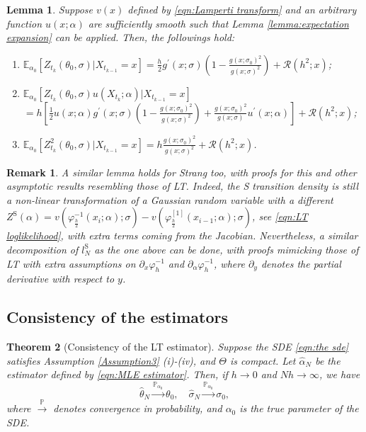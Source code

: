 \documentclass[a4paper,12pt]{article}
\numberwithin{equation}{section}
\theoremstyle{plain}
\newtheorem{theorem}{Theorem}[section]
\newtheorem{lemma}[theorem]{Lemma}
\newtheorem{remark}{Remark}
\theoremstyle{definition}
\begin{document}
\begin{lemma}\label{lemma:Z moment bounds}
    Suppose $v(x)$ defined by \eqref{eqn:Lamperti transform} and an arbitrary function $u(x;\alpha)$ are sufficiently smooth such that Lemma \ref{lemma:expectation expansion} can be applied. Then, the followings hold:
    \begin{enumerate}
        \item[(i)]
            $\mathbb{E}_{\alpha_0}[Z_{t_k}(\theta_0,\sigma)|X_{t_{k-1}}=x]=\frac{h}{2}g^\prime(x;\sigma)(1-\frac{g(x;\sigma_0)^2}{g(x;\sigma)^2})+\mathcal{R}(h^2;x)$;
        \item[(ii)]
            $\mathbb{E}_{\alpha_0}[Z_{t_k}(\theta_0,\sigma)u(X_{t_k};\alpha)|X_{t_{k-1}}=x]$\\ $=h\left[\frac{1}{2}u(x;\alpha)g^\prime (x;\sigma)\left(1-\frac{g(x;\sigma_0)^2}{g(x;\sigma)^2}\right)+\frac{g(x;\sigma_0)^2}{g(x;\sigma)}u^\prime(x;\alpha)\right]+\mathcal{R}(h^2;x)$;
       \item[(iii)]
            $\mathbb{E}_{\alpha_0}[Z_{t_k}^2(\theta_0,\sigma)|X_{t_{k-1}}=x]=h\frac{g(x;\sigma_0)^2}{g(x;\sigma)^2}+\mathcal{R}(h^2;x)$.
    \end{enumerate}
\end{lemma}
\begin{remark}\label{remarkS}
A similar lemma holds for Strang too, with proofs for this and other asymptotic results resembling those of LT. Indeed, the S transition density is still a non-linear transformation of a Gaussian random variable with a different 
$Z^{\text{S}}(\alpha)=v(\varphi^{-1}_{\frac{h}{2}}(x_{i};\alpha);\sigma)-v(\varphi^{[1]}_{\frac{h}{2}}(x_{i-1};\alpha);\sigma)$, see \eqref{eqn:LT loglikelihood}, with extra terms coming from the Jacobian. Nevertheless, a similar decomposition of $l^{\textrm{S}}_N$ as the one above can be done, with proofs mimicking those of LT with extra assumptions on $\partial_x \varphi^{-1}_h$ and $\partial_\alpha \varphi^{-1}_h$, where $\partial_y $ denotes the partial derivative with respect to $y$. 
\end{remark}
\subsection{Consistency of the estimators}

\begin{theorem}[Consistency of the LT estimator]\label{thrm:asymptotic consistency}
Suppose the SDE \eqref{eqn:the sde} satisfies Assumption \ref{Assumption3} (i)-(iv), and $\Theta$ is compact. Let $\hat{\alpha}_N$ be the estimator defined by \eqref{eqn:MLE estimator}. Then, if $h\to0$ and $Nh\to \infty$, we have
    \begin{equation*}
        \hat{\theta}_N \stackrel{\mathbb{P}_{\alpha_0}}{\to} \theta_0,\quad \hat{\sigma}_N \stackrel{\mathbb{P}_{\alpha_0}}{\to} \sigma_0,
    \end{equation*}
    where $\stackrel{\mathbb{P}}{\to}$ denotes convergence in probability, and
    $\alpha_0$ is the true parameter of the SDE.
\end{theorem}
\end{document}

